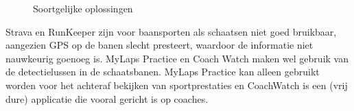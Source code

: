 \begin{figure}[ht]
\centering
{}
\caption{Soortgelijke oplossingen}
\label{fig:soortgelijke-oplossingen}
\end{figure}

Strava en RunKeeper zijn voor baansporten als schaatsen niet goed bruikbaar, aangezien GPS op de banen slecht presteert, waardoor de informatie niet nauwkeurig goenoeg is. MyLaps Practice en Coach Watch maken wel gebruik van de detectielussen in de schaatsbanen. MyLaps Practice kan alleen gebruikt worden voor het achteraf bekijken van sportprestaties en CoachWatch is een (vrij dure) applicatie die vooral gericht is op coaches.

